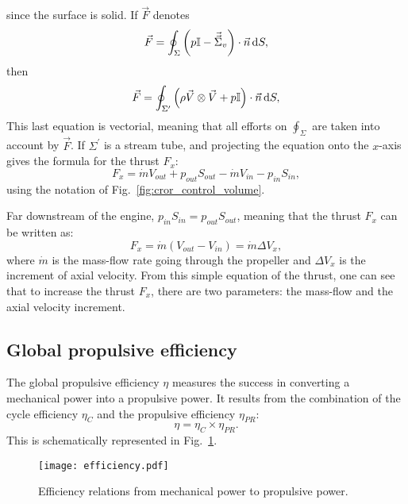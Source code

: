 since the surface is solid. If $\vec{F}$ denotes
\begin{equation}
	\vec{F} = \oint_{\Sigma} \left(p \mathbb{I} - 
	\vec{\vec{\Sigma}}_v \right) \cdot \vec{n} \mathop{}\!\mathrm{d} S,
\end{equation}
then
\begin{equation}
	\vec{F} = \oint_{\Sigma^\prime} \left(\rho \vec{V} \otimes \vec{V} +
	p \mathbb{I} \right) \cdot \vec{n} \mathop{}\!\mathrm{d} S,
\end{equation}
This last equation is vectorial, meaning that all efforts on 
$\oint_{\Sigma}$ are taken into account by $\vec{F}$.
If $\Sigma^\prime$ is a stream tube, and projecting the equation
onto the $x$-axis gives the formula for the thrust $F_x$:
\begin{equation}
	F_x = \dot{m} V_{out} + p_{out} S_{out}
	- \dot{m} V_{in} - p_{in} S_{in},
\end{equation}
using the notation of Fig.~\ref{fig:cror_control_volume}.

Far downstream of the engine, $p_{in} S_{in} = p_{out} S_{out}$, meaning
that the thrust $F_x$ can be written as:
\begin{equation}
	F_x = \dot{m} (V_{out} - V_{in}) = \dot{m} \Delta V_x,
	\label{eq:cror_thrust}
\end{equation}
where $\dot{m}$ is the mass-flow rate going through the
propeller and $\Delta V_x$ is
the increment of axial velocity. From this simple equation of the thrust,
one can see that to increase the thrust $F_x$, there are two parameters:
the mass-flow and the axial velocity increment.

\subsection{Global propulsive efficiency}
\label{sub:cror_efficiency}

The global propulsive efficiency $\eta$ measures the 
success in converting a mechanical power into a
propulsive power. It results from the combination
of the cycle efficiency $\eta_{C}$ and the propulsive efficiency
$\eta_{PR}$:
\begin{equation}
	\eta = \eta_{C} \times \eta_{PR}.
\end{equation}
This is schematically represented in Fig.~\ref{fig:cror_efficiency}.
\begin{figure}[htb]
  \centering
  \texttt{[image: efficiency.pdf]}
  \caption{Efficiency relations from mechanical power to propulsive power.}
  \label{fig:cror_efficiency}
\end{figure}


